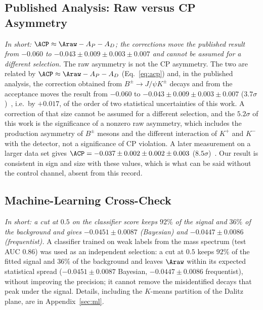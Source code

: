 \subsection{Published Analysis: Raw versus CP Asymmetry}
\emph{In short: $\ACP\approx\Araw-A_P-A_D$; the corrections move the published result from $-0.060$ to $-0.043\pm0.009\pm0.003\pm0.007$ and cannot be assumed for a different selection.}
The raw asymmetry is not the CP asymmetry. The two are related by $\ACP\approx\Araw-A_P-A_D$ (Eq.~\eqref{eq:acp}) and, in the published analysis, the correction obtained from $B^\pm\to J/\psi K^\pm$ decays and from the acceptance moves the result from $-0.060$ to $-0.043\pm0.009\pm0.003\pm0.007$ ($3.7\sigma$)~\cite{lhcb_cpv_2013}, i.e.\ by $+0.017$, of the order of two statistical uncertainties of this work. A correction of that size cannot be assumed for a different selection, and the $5.2\sigma$ of this work is the significance of a nonzero raw asymmetry, which includes the production asymmetry of $B^\pm$ mesons and the different interaction of $K^+$ and $K^-$ with the detector, not a significance of CP violation. A later measurement on a larger data set gives $\ACP=-0.037\pm0.002\pm0.002\pm0.003$ ($8.5\sigma$)~\cite{lhcb_cpv_prd2023,lhcb_cpv_paper}. Our result is consistent in sign and size with these values, which is what can be said without the control channel, absent from this record.

\subsection{Machine-Learning Cross-Check}
\emph{In short: a cut at $0.5$ on the classifier score keeps $92\%$ of the signal and $36\%$ of the background and gives $-0.0451\pm0.0087$ (Bayesian) and $-0.0447\pm0.0086$ (frequentist).}
A classifier trained on weak labels from the mass spectrum (test AUC $0.86$) was used as an independent selection: a cut at $0.5$ keeps $92\%$ of the fitted signal and $36\%$ of the background and leaves $\Araw$ within its expected statistical spread ($-0.0451\pm0.0087$ Bayesian, $-0.0447\pm0.0086$ frequentist), without improving the precision; it cannot remove the misidentified decays that peak under the signal. Details, including the $K$-means partition of the Dalitz plane, are in Appendix~\ref{sec:ml}.

